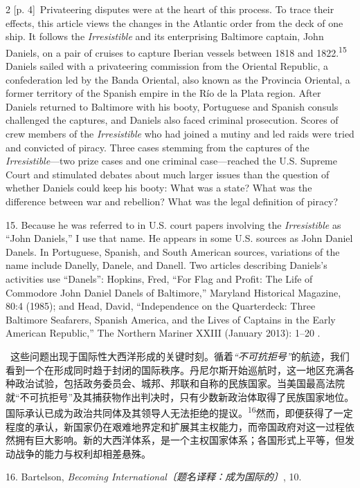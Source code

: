 \documentclass[10pt,a4paper]{article}
\begin{document}
\begin{paracol}{2}
{\scriptsize\color{gray} [p. 4]}\ Privateering disputes were at the heart of this process. To trace their effects, this article views the changes in the Atlantic order from the deck of one ship. It follows the \textit{Irresistible} and its enterprising Baltimore captain, John Daniels, on a pair of cruises to capture Iberian vessels between 1818 and 1822.\nobreak\textsuperscript{15} Daniels sailed with a privateering commission from the Oriental Republic, a confederation led by the Banda Oriental, also known as the Provincia Oriental, a former territory of the Spanish empire in the Río de la Plata region. After Daniels returned to Baltimore with his booty, Portuguese and Spanish consuls challenged the captures, and Daniels also faced criminal prosecution. Scores of crew members of the \textit{Irresistible} who had joined a mutiny and led raids were tried and convicted of piracy. Three cases stemming from the captures of the \textit{Irresistible}—two prize cases and one criminal case—reached the U.S. Supreme Court and stimulated debates about much larger issues than the question of whether Daniels could keep his booty: What was a state? What was the difference between war and rebellion? What was the legal definition of piracy?\par{\small 15. Because he was referred to in U.S. court papers involving the \textit{Irresistible} as “John Daniels,” I use that name. He appears in some U.S. sources as John Daniel Danels. In Portuguese, Spanish, and South American sources, variations of the name include Danelly, Danele, and Danell. Two articles describing Daniels’s activities use “Danels”: Hopkins, Fred, “For Flag and Profit: The Life of Commodore John Daniel Danels of Baltimore,” Maryland Historical Magazine, 80:4 (1985); and Head, David, “Independence on the Quarterdeck: Three Baltimore Seafarers, Spanish America, and the Lives of Captains in the Early American Republic,” The Northern Mariner XXIII (January 2013): 1–20 .\par}
\switchcolumn*
{\scriptsize\color{gray} [p. 5]}\ 这些问题出现于国际性大西洋形成的关键时刻。循着\textit{“不可抗拒号”}的航迹，我们看到一个在形成同时趋于封闭的国际秩序。丹尼尔斯开始巡航时，这一地区充满各种政治试验，包括政务委员会、城邦、邦联和自称的民族国家。当美国最高法院就“不可抗拒号”及其捕获物作出判决时，只有少数新政治体取得了民族国家地位。国际承认已成为政治共同体及其领导人无法拒绝的提\mbox{议。\textsuperscript{16}}然而，即便获得了一定程度的承认，新国家仍在艰难地界定和扩展其主权能力，而帝国政府对这一过程依然拥有巨大影响。新的大西洋体系，是一个主权国家体系；各国形式上平等，但发动战争的能力与权利却相差悬殊。\par{\small 16. Bartelson, \textit{Becoming International〔题名译释：成为国际的〕}, 10.\par}

\end{paracol}
\end{document}
